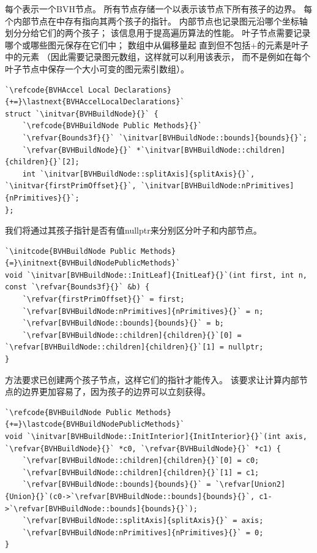 每个表示一个BVH节点。
所有节点存储一个以表示该节点下所有孩子的边界。
每个内部节点在中存有指向其两个孩子的指针。
内部节点也记录图元沿哪个坐标轴划分分给它们的两个孩子；
该信息用于提高遍历算法的性能。
叶子节点需要记录哪个或哪些图元保存在它们中；
数组中从偏移量起
直到但不包括{\ttfamily{}+}的元素是叶子中的元素
（因此需要记录图元数组，这样就可以利用该表示，
而不是例如在每个叶子节点中保存一个大小可变的图元索引数组）。
\begin{lstlisting}
`\refcode{BVHAccel Local Declarations}{+=}\lastnext{BVHAccelLocalDeclarations}`
struct `\initvar{BVHBuildNode}{}` {
    `\refcode{BVHBuildNode Public Methods}{}`
    `\refvar{Bounds3f}{}` `\initvar[BVHBuildNode::bounds]{bounds}{}`;
    `\refvar{BVHBuildNode}{}` *`\initvar[BVHBuildNode::children]{children}{}`[2];
    int `\initvar[BVHBuildNode::splitAxis]{splitAxis}{}`, `\initvar{firstPrimOffset}{}`, `\initvar[BVHBuildNode:nPrimitives]{nPrimitives}{}`;
};
\end{lstlisting}

我们将通过其孩子指针是否有值{\ttfamily nullptr}来分别区分叶子和内部节点。
\begin{lstlisting}
`\initcode{BVHBuildNode Public Methods}{=}\initnext{BVHBuildNodePublicMethods}`
void `\initvar[BVHBuildNode::InitLeaf]{InitLeaf}{}`(int first, int n, const `\refvar{Bounds3f}{}` &b) {
    `\refvar{firstPrimOffset}{}` = first;
    `\refvar[BVHBuildNode:nPrimitives]{nPrimitives}{}` = n;
    `\refvar[BVHBuildNode::bounds]{bounds}{}` = b;
    `\refvar[BVHBuildNode::children]{children}{}`[0] = `\refvar[BVHBuildNode::children]{children}{}`[1] = nullptr;
}
\end{lstlisting}

方法要求已创建两个孩子节点，这样它们的指针才能传入。
该要求让计算内部节点的边界更加容易了，因为孩子的边界可以立刻获得。
\begin{lstlisting}
`\refcode{BVHBuildNode Public Methods}{+=}\lastcode{BVHBuildNodePublicMethods}`
void `\initvar[BVHBuildNode::InitInterior]{InitInterior}{}`(int axis, `\refvar{BVHBuildNode}{}` *c0, `\refvar{BVHBuildNode}{}` *c1) {
    `\refvar[BVHBuildNode::children]{children}{}`[0] = c0;
    `\refvar[BVHBuildNode::children]{children}{}`[1] = c1;
    `\refvar[BVHBuildNode::bounds]{bounds}{}` = `\refvar[Union2]{Union}{}`(c0->`\refvar[BVHBuildNode::bounds]{bounds}{}`, c1->`\refvar[BVHBuildNode::bounds]{bounds}{}`);
    `\refvar[BVHBuildNode::splitAxis]{splitAxis}{}` = axis;
    `\refvar[BVHBuildNode:nPrimitives]{nPrimitives}{}` = 0;
}
\end{lstlisting}

